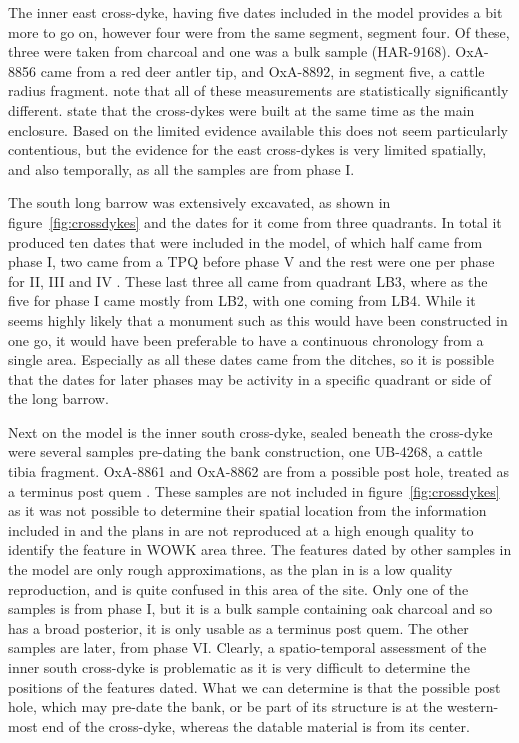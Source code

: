 The inner east cross-dyke, having five dates included in the model provides a bit more to go on, however four were from the same segment, segment four. Of these, three were taken from charcoal and one was a bulk sample (HAR-9168). OxA-8856 came from a red deer antler tip, and OxA-8892, in segment five, a cattle radius fragment. \citet[401]{Mercer:2008fk} note that all of these measurements are statistically significantly different. \citet[136]{Whittle:2011kl} state that the cross-dykes were built at the same time as the main enclosure. Based on the limited evidence available this does not seem particularly contentious, but the evidence for the east cross-dykes is very limited spatially, and also temporally, as all the samples are from phase I.
 
The south long barrow was extensively excavated, as shown in figure~\ref{fig:crossdykes} and the dates for it come from three quadrants. In total it produced ten dates that were included in the model, of which half came from phase I, two came from a TPQ before phase V and the rest were one per phase for II, III and IV \cite[401]{Mercer:2008fk}. These last three all came from quadrant LB3, where as the five for phase I came mostly from LB2, with one coming from LB4. While it seems highly likely that a monument such as this would have been constructed in one go, it would have been preferable to have a continuous chronology from a single area. Especially as all these dates came from the ditches, so it is possible that the dates for later phases may be activity in a specific quadrant or side of the long barrow.

Next on the model is the inner south cross-dyke, sealed beneath the cross-dyke were several samples pre-dating the bank construction, one UB-4268, a cattle tibia fragment. OxA-8861 and OxA-8862 are from a possible post hole, treated as a terminus post quem \citep[402]{Mercer:2008fk}. These samples are not included in figure~\ref{fig:crossdykes} as it was not possible to determine their spatial location from the information included in \cite{Whittle:2011kl} and the plans in \cite{Mercer:2008fk} are not reproduced at a high enough quality to identify the feature in WOWK area three. The features dated by other samples in the model are only rough approximations, as the plan in \cite{Mercer:2008fk} is a low quality reproduction, and is quite confused in this area of the site. Only one of the samples is from phase I, but it is a bulk sample containing oak charcoal and so has a broad posterior, it is only usable as a terminus post quem. The other samples are later, from phase VI. Clearly, a spatio-temporal assessment of the inner south cross-dyke is problematic as it is very difficult to determine the positions of the features dated. What we can determine is that the possible post hole, which may pre-date the bank, or be part of its structure \citep[402]{Mercer:2008fk} is at the western-most end of the cross-dyke, whereas the datable material is from its center.

